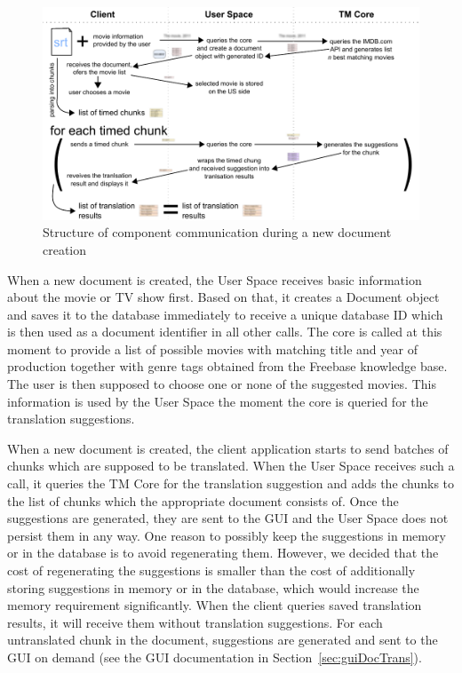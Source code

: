 \begin{figure}
\begin{center}
\includegraphics{figures/creating_document.pdf}
\end{center}
\caption{Structure of component communication during a new document creation}
\end{figure}

When a new document is created, the User Space receives basic information about the movie or TV show first. Based on that, it creates a Document object and saves it to the database immediately to receive a unique database ID which is then used as a document identifier in all other calls. The core is called at this moment to provide a list of possible movies with matching title and year of production together with genre tags obtained from the Freebase knowledge base. The user is then supposed to choose one or none of the suggested movies. This information is used by the User Space the moment the core is queried for the translation suggestions.

When a new document is created, the client application starts to send batches of chunks which are supposed to be translated. When the User Space receives such a call, it queries the TM Core for the translation suggestion and adds the chunks to the list of chunks which the appropriate document consists of. Once the suggestions are generated, they are sent to the GUI and the User Space does not persist them in any way. One reason to possibly keep the suggestions in memory or in the database is to avoid regenerating them. However, we decided that the cost of regenerating the suggestions is smaller than the cost of additionally storing suggestions in memory or in the database, which would increase the memory requirement significantly. When the client queries saved translation results, it will receive them without translation suggestions. For each untranslated chunk in the document, suggestions are generated and sent to the GUI on demand (see the GUI documentation in Section~\ref{sec:guiDocTrans}).

